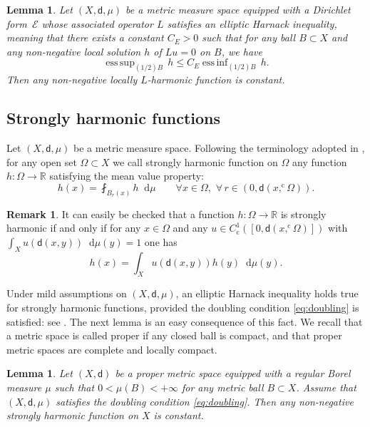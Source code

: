\documentclass[JEP,XML,SOM,Unicode,published]{cedram}
\newcommand{\rmc}{\mathrm{c}}
\theoremstyle{plain}
\newtheorem{lemma}[theorem]{Lemma}
\theoremstyle{definition}
\newtheorem{remark}[theorem]{Remark}
\newcommand{\setR}{\mathbb{R}}
\newcommand{\cE}{\mathcal{E}}
\newcommand{\di}{\mathop{}\!\mathrm{d}}
\newcommand{\dist}{\mathsf{d}}
\DeclareMathOperator*{\essssup}{ess\,sup}
\DeclareMathOperator*{\esssinf}{ess\,inf}
\begin{document}
\begin{lemma}\label{lem:ellipticHarnack}
Let $(X,\dist,\mu)$ be a metric measure space equipped with a Dirichlet form~$\cE$ whose associated operator $L$ satisfies an elliptic Harnack inequality, meaning that there exists a constant $C_E>0$ such that for any ball $B \subset X$ and any non-negative local solution $h$ of $Lu=0$ on $B$, we have
\begin{equation}\label{eq:ellipticHarnack}
\essssup_{(1/2)B} \, h \le C_E \esssinf_{(1/2)B} \, h.
\end{equation}
Then any non-negative locally $L$-harmonic function is constant.
\end{lemma}

\subsection*{Strongly harmonic functions}

Let $(X,\dist,\mu)$ be a metric measure space. Following the terminology adopted in \cite{GaczkowskiGorka, AGG19}, for any open set $\Omega \subset X$ we call strongly harmonic function on $\Omega$ any function $h:\Omega\to\setR$ satisfying the mean value property:
\[
h(x) = \fint_{B_r(x)} h \di \mu \qquad \forall x \in \Omega, \, \, \forall \, r\in(0, \dist(x,^\rmc\!\Omega)).
\]
\begin{remark}\label{rem:defalternative}
It can easily be checked that a function $h:\Omega\to\setR$ is strongly harmonic if and only if for any $x\in \Omega$ and any $u\in C_\rmc^1\left(\left[0, \dist(x,^\rmc\!\Omega)\right]\right)$ with
$\int_X u(\dist(x,y))\di \mu(y) = 1$ one has
\[
h(x) = \int_{X}u\left(\dist(x,y)\right) h(y) \di \mu(y).
\]
\end{remark}
Under mild assumptions on $(X,\dist,\mu)$, an elliptic Harnack inequality holds true for strongly harmonic functions, provided the doubling condition \eqref{eq:doubling} is satisfied: see \cite[Lem.\,4.1]{AGG19}. The next lemma is an easy consequence of this fact. We recall that a metric space is called proper if any closed ball is compact, and that proper metric spaces are complete and locally compact.

\begin{lemma}\label{lem:Harnackstrongly}
Let $(X,\dist)$ be a proper metric space equipped with a regular Borel measure $\mu$ such that $0<\mu(B)<+\infty$ for any metric ball $B \subset X$. Assume that $(X,\dist,\mu)$ satisfies the doubling condition \eqref{eq:doubling}. Then any non-negative strongly harmonic function on $X$ is constant.
\end{lemma}
\end{document}
